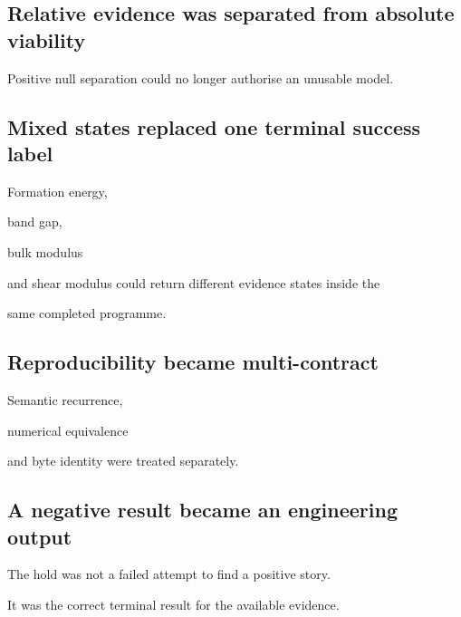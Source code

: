 \documentclass[11pt,a4paper,oneside]{report}
\begin{document}
\subsection{Relative evidence was separated from absolute viability}



Positive null separation could no longer authorise an unusable model.



\subsection{Mixed states replaced one terminal success label}



Formation energy,

band gap,

bulk modulus

and shear modulus could return different evidence states inside the

same completed programme.



\subsection{Reproducibility became multi-contract}



Semantic recurrence,

numerical equivalence

and byte identity were treated separately.



\subsection{A negative result became an engineering output}



The hold was not a failed attempt to find a positive story.



It was the correct terminal result for the available evidence.
\end{document}

